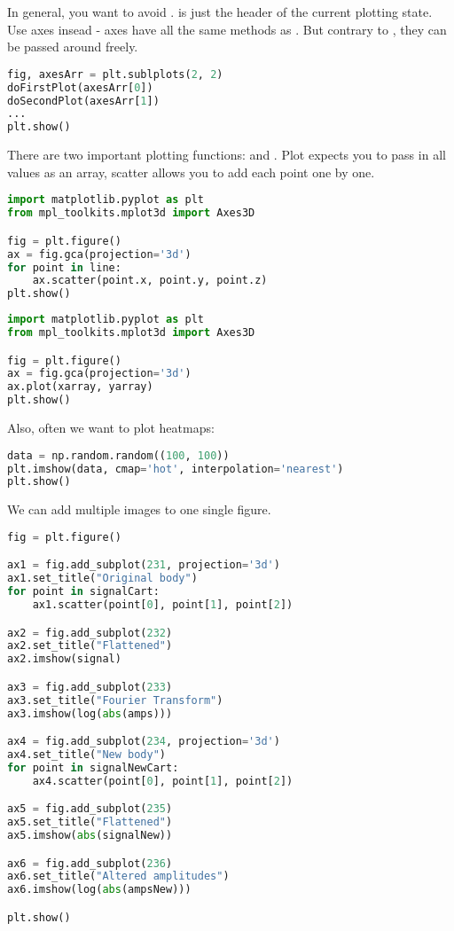 In general, you want to avoid .  is just the header of the current plotting state. Use axes insead - axes have all the same methods as . But contrary to , they can be passed around freely. 
\begin{lstlisting}[language=python]
fig, axesArr = plt.sublplots(2, 2)
doFirstPlot(axesArr[0])
doSecondPlot(axesArr[1])
...
plt.show()
\end{lstlisting}

There are two important plotting functions:  and . Plot expects you to pass in all values as an array, scatter allows you to add each point one by one. 

\begin{lstlisting}[language=python]
import matplotlib.pyplot as plt
from mpl_toolkits.mplot3d import Axes3D

fig = plt.figure()
ax = fig.gca(projection='3d')
for point in line:
    ax.scatter(point.x, point.y, point.z)
plt.show()
\end{lstlisting}

\begin{lstlisting}[language=python]
import matplotlib.pyplot as plt
from mpl_toolkits.mplot3d import Axes3D

fig = plt.figure()
ax = fig.gca(projection='3d')
ax.plot(xarray, yarray)
plt.show()
\end{lstlisting}

Also, often we want to plot heatmaps: 
\begin{lstlisting}[language=python]
data = np.random.random((100, 100))
plt.imshow(data, cmap='hot', interpolation='nearest')
plt.show()
\end{lstlisting}

We can add multiple images to one single figure. 
\begin{lstlisting}[language=python]
fig = plt.figure()

ax1 = fig.add_subplot(231, projection='3d')
ax1.set_title("Original body")
for point in signalCart:
    ax1.scatter(point[0], point[1], point[2])

ax2 = fig.add_subplot(232)
ax2.set_title("Flattened")
ax2.imshow(signal)

ax3 = fig.add_subplot(233)
ax3.set_title("Fourier Transform")
ax3.imshow(log(abs(amps)))

ax4 = fig.add_subplot(234, projection='3d')
ax4.set_title("New body")
for point in signalNewCart:
    ax4.scatter(point[0], point[1], point[2])

ax5 = fig.add_subplot(235)
ax5.set_title("Flattened")
ax5.imshow(abs(signalNew))

ax6 = fig.add_subplot(236)
ax6.set_title("Altered amplitudes")
ax6.imshow(log(abs(ampsNew)))

plt.show()
\end{lstlisting}

